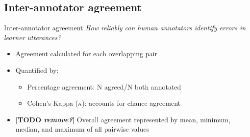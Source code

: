 \documentclass[xcolor={dvipsnames}]{beamer}
\newcommand{\TODO}[1]{{\color{red}\textbf{[TODO #1]}}}
\begin{document}
	\subsection{Inter-annotator agreement}
		\begin{frame}{Inter-annotator agreement}
		\textit{How reliably can human annotators identify errors in learner utterances?}
		\vspace{1em}
		\begin{itemize}
		\item Agreement calculated for each overlapping pair
		\item Quantified by:
			\begin{itemize}
			\item Percentage agreement: N agreed/N both annotated
			\item Cohen's Kappa ($\kappa$): accounts for chance agreement
			\end{itemize}
		\item \TODO{\textit{remove?}} Overall agreement represented by mean, minimum, median, and maximum of all pairwise values
		\end{itemize}
		
		\end{frame}
		
\end{document}
